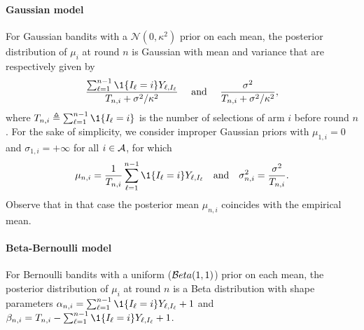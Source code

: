 \paragraph{Gaussian model} For Gaussian bandits with a $\mathcal{N}(0,\kappa^2)$ prior on each mean, the posterior distribution of $\mu_i$ at round $n$ is Gaussian with mean and variance that are respectively given by
\[\frac{\sum_{\ell=1}^{n-1} \1\{I_\ell = i\} Y_{\ell,I_\ell}}{T_{n,i} + \sigma^2/\kappa^2}\quad\text{ and }\quad \frac{\sigma^2}{T_{n,i} + \sigma^2/\kappa^2},\]
where $T_{n,i}\eqdef\sum_{\ell=1}^{n-1} \1{\{ I_{\ell} = i \}}$ is the number of selections of arm $i$ before round $n$.
% 
For the sake of simplicity, we consider improper Gaussian priors with $\mu_{1,i}=0$ and $\sigma_{1,i}=+\infty$ for all $i\in\mathcal{A}$, for which
\[
    \mu_{n,i}  = \frac{1}{T_{n,i}} \sum_{\ell=1}^{n-1} \1\{I_\ell = i\}Y_{\ell,I_\ell} \quad \text{and} \quad \sigma_{n,i}^2 = \frac{\sigma^2}{T_{n,i}}.
\]
Observe that in that case the posterior mean $\mu_{n,i}$ coincides with the empirical mean.

\paragraph{Beta-Bernoulli model} For Bernoulli bandits with a uniform ($\mathcal{B} eta(1,1)$) prior on each mean, the posterior distribution of $\mu_i$ at round $n$ is a Beta distribution with shape parameters $\alpha_{n,i} = \sum_{\ell=1}^{n-1} \1{\{ I_{\ell} = i \}} Y_{\ell,I_{\ell}} +1$ and $\beta_{n,i} = T_{n,i} - \sum_{\ell=1}^{n-1} \1{\{ I_{\ell} = i \}} Y_{\ell,I_{\ell}} + 1$. 

